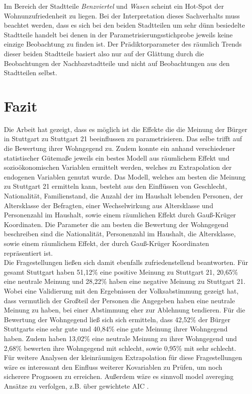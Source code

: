\documentclass{Vorlage}
\begin{document}
Im Bereich der Stadtteile \textit{Benzviertel} und \textit{Wasen} scheint ein Hot-Spot der Wohnunzufriedenheit zu liegen. Bei der Interpretation dieses Sachverhalts muss beachtet werden, dass es sich bei den beiden Stadtteilen um sehr dünn besiedelte Stadtteile handelt bei denen in der Parametrisierungsstichprobe jeweils keine einzige Beobachtung zu finden ist. Der Prädiktorparameter des räumlich Trends dieser beiden Stadtteile basiert also nur auf der Glättung durch die Beobachtungen der Nachbarstadtteile und nicht auf Beobachtungen aus den Stadtteilen selbst.

\newpage
\section{Fazit}
Die Arbeit hat gezeigt, dass es möglich ist die Effekte die die Meinung der Bürger in Stuttgart zu Stuttgart 21 beeinflussen zu parametrisieren. Das selbe trifft auf die Bewertung ihrer Wohngegend zu. Zudem konnte ein anhand verschiedener statistischer Gütemaße jeweils ein bestes Modell aus räumlichem Effekt und sozioökonomischen Variablen ermittelt werden, welches zu Extrapolation der endogenen Variablen genutzt wurde. Das Modell, welches am besten die Meinung zu Stuttgart 21 ermitteln kann, besteht aus den Einflüssen von Geschlecht, Nationalität, Familienstand, die Anzahl der im Haushalt lebenden Personen, der Altersklasse der Befragten, einer Wechselwirkung aus Altersklasse und  Personenzahl im Haushalt, sowie einem räumlichen Effekt durch Gauß-Krüger Koordinaten. Die Parameter die am besten die Bewertung der Wohngegend beschreiben sind die Nationalität, Personenzahl im Haushalt, die Altersklasse, sowie einem räumlichem Effekt, der durch Gauß-Krüger Koordinaten repräsentiert ist. \\
Die Fragestellungen ließen sich damit ebenfalls zufriedenstellend beantworten. Für gesamt Stuttgart haben 51,12\% eine positive Meinung zu Stuttgart 21, 20,65\% eine neutrale Meinung und 28,22\% haben eine negative Meinung zu Stuttgart 21. Wobei eine Validierung mit den Ergebnissen der Volksabstimmung gezeigt hat, dass vermutlich der Großteil der Personen die Angegeben haben eine neutrale Meinung zu haben, bei einer Abstimmung eher zur Ablehnung tendieren. Für die Bewertung der Wohngegend ließ sich sich ermitteln, dass 42,52\% der Bürger Stuttgarts eine sehr gute und 40,84\% eine gute Meinung ihrer Wohngegend haben. Zudem haben 13,02\% eine neutrale Meinung zu ihrer Wohngegend und 2,68\% bewerten ihre Wohngegend mit schlecht, sowie 0,95\% mit sehr schlecht.\\
Für weitere Analysen der kleinräumigen Extrapolation für diese Fragestellungen wäre es interessant den Einfluss weiterer Kovariablen zu Prüfen, um noch sicherere Prognosen zu erreichen. Außerdem wäre es sinnvoll model avereging Ansätze zu verfolgen, z.B. über gewichtete AIC \cite{WAIC}.
\end{document}
